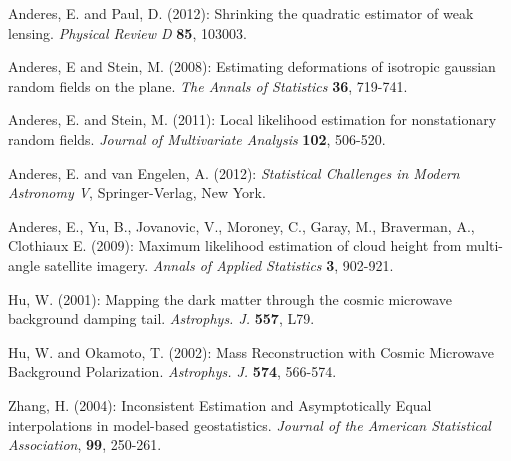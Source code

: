 \documentclass[12pt]{article}
\begin{document}
\begin{enumerate}[labelindent=0pt,label={[\arabic*]}]
\item\label{AP}
Anderes, E. and Paul, D. (2012):  Shrinking the quadratic estimator of weak lensing.
\textit{Physical Review D} {\bf 85}, 103003.






\item\label{AS1}
Anderes, E and Stein, M. (2008): Estimating deformations of isotropic gaussian random fields on the plane. \textit{The Annals of Statistics} {\bf 36}, 719-741.




\item\label{AS2}
Anderes, E. and Stein, M. (2011):  Local likelihood estimation for nonstationary random fields.  \textit{Journal of Multivariate Analysis} {\bf 102}, 506-520.




\item\label{AV}
Anderes, E. and van Engelen, A. (2012):  \textit{Statistical Challenges in Modern Astronomy V}, Springer-Verlag, New York.






\item \label{AY}
Anderes, E., Yu, B., Jovanovic, V., Moroney, C., Garay, M., Braverman, A., Clothiaux E. (2009):
Maximum likelihood estimation of cloud height from multi-angle satellite imagery.   \textit{Annals of Applied Statistics} {\bf 3}, 902-921.


\item \label{H1}
Hu, W. (2001):
Mapping the dark matter through the cosmic microwave background damping tail.
\textit{Astrophys. J.} {\bf 557}, L79.

\item \label{H2}
Hu, W. and Okamoto, T. (2002):  Mass Reconstruction with Cosmic Microwave Background Polarization.
\textit{Astrophys. J.} {\bf 574}, 566-574.



\item \label{ZH}
 Zhang, H. (2004):
Inconsistent Estimation and Asymptotically Equal interpolations in model-based geostatistics. \textit{Journal of the American Statistical Association}, {\bf 99}, 250-261.

 \end{enumerate}
\end{document}
